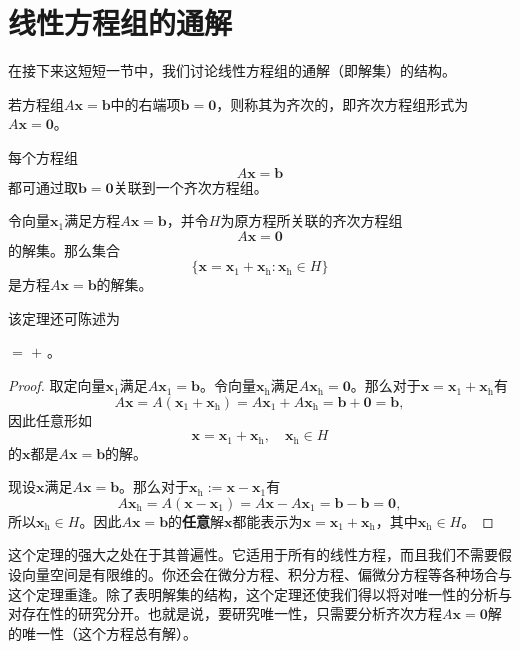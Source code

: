 \section{线性方程组的通解}\label{sec:general_solution}

在接下来这短短一节中，我们讨论线性方程组的通解（即解集）的结构。

若方程组$A\mathbf{x}=\mathbf{b}$中的右端项$\mathbf{b}=\mathbf{0}$，则称其为齐次的，即齐次方程组形式为$A\mathbf{x}=\mathbf{0}$。

每个方程组\[A\mathbf{x}=\mathbf{b}\]都可通过取$\mathbf{b}=\mathbf{0}$关联到一个齐次方程组。

\begin{theorem}[线性方程组的通解]\label{thm:general_solution}
  令向量$\mathbf{x}_1$满足方程$A\mathbf{x}=\mathbf{b}$，并令$H$为原方程所关联的齐次方程组\[A\mathbf{x}=\mathbf{0}\]的解集。那么集合\[\{\mathbf{x}=\mathbf{x}_1+\mathbf{x}_\mathrm{h}:\mathbf{x}_\mathrm{h}\in H\}\]是方程$A\mathbf{x}=\mathbf{b}$的解集。
\end{theorem}

该定理还可陈述为
\begin{center}
   $=$  $+$ 。
\end{center}
\begin{proof}
  取定向量$\mathbf{x}_{1}$满足$A\mathbf{x}_{1}=\mathbf{b}$。令向量$\mathbf{x}_\mathrm{h}$满足$A\mathbf{x}_\mathrm{h}=\mathbf{0}$。那么对于$\mathbf{x}=\mathbf{x}_{1}+\mathbf{x}_{\mathrm{h}}$有\[A\mathbf{x}=A(\mathbf{x}_1+\mathbf{x}_\mathrm{h})=A\mathbf{x}_1+A\mathbf{x}_\mathrm{h}=\mathbf{b}+\mathbf{0}=\mathbf{b},\]
  因此任意形如\[\mathbf{x}=\mathbf{x}_1+\mathbf{x}_\mathrm{h},\quad\mathbf{x}_\mathrm{h}\in H\]的$\mathbf{x}$都是$A\mathbf{x}=\mathbf{b}$的解。
  
  现设$\mathbf{x}$满足$A\mathbf{x}=\mathbf{b}$。那么对于$\mathbf{x}_\mathrm{h}:=\mathbf{x}-\mathbf{x}_1$有\[A\mathbf{x}_\mathrm{h}=A(\mathbf{x}-\mathbf{x}_1)=A\mathbf{x}-A\mathbf{x}_1=\mathbf{b}-\mathbf{b}=\mathbf{0},\]
  所以$\mathbf{x}_\mathrm{h}\in H$。因此$A\mathbf{x}=\mathbf{b}$的\textbf{任意}解$\mathbf{x}$都能表示为$\mathbf{x}=\mathbf{x}_1+\mathbf{x}_\mathrm{h}$，其中$\mathbf{x}_\mathrm{h}\in H$。
\end{proof}

这个定理的强大之处在于其普遍性。它适用于所有的线性方程，而且我们不需要假设向量空间是有限维的。你还会在微分方程、积分方程、偏微分方程等各种场合与这个定理重逢。除了表明解集的结构，这个定理还使我们得以将对唯一性的分析与对存在性的研究分开。也就是说，要研究唯一性，只需要分析齐次方程$A\mathbf{x}=\mathbf{0}$解的唯一性（这个方程总有解）。

